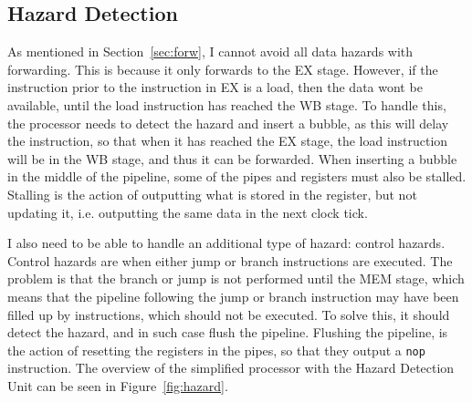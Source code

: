 \subsection{Hazard Detection}\label{sec:haz}
As mentioned in Section~\ref{sec:forw}, I cannot avoid all data hazards with
forwarding. This is because it only forwards to the EX stage. However,
if the instruction prior to the instruction in EX is a load, then the data wont
be available, until the load instruction has reached the WB stage. To handle
this, the processor needs to detect the hazard and insert a bubble, as this
will delay the instruction, so that when it has reached the EX stage, the load
instruction will be in the WB stage, and thus it can be forwarded. When
inserting a bubble in the middle of the pipeline, some of the pipes and
registers must also be stalled. Stalling is the action of outputting what is stored
in the register, but not updating it, i.e. outputting the same data in the
next clock tick.

I also need to be able to handle an additional type of hazard: control
hazards. Control hazards are when either jump or branch instructions are
executed. The problem is that the branch or jump is not performed until the MEM
stage, which means that the pipeline following the jump or branch instruction
may have been filled up by instructions, which should not be executed. To solve
this, it should detect the hazard, and in such case flush the pipeline.
Flushing the pipeline, is the action of resetting the registers in the pipes,
so that they output a \texttt{nop} instruction. The overview of the simplified
processor with the Hazard Detection Unit can be seen in Figure~\ref{fig:hazard}.

